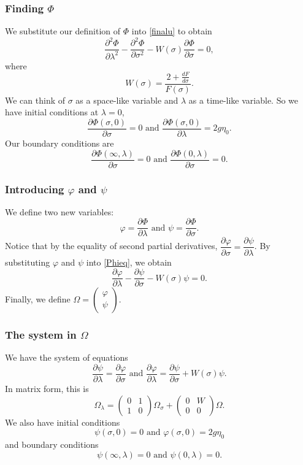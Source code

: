\documentclass[xcolor=dvipsnames]{beamer}
\begin{document}
\begin{frame}
\frametitle{Finding $\Phi$}
We substitute our definition of $\Phi$ into \eqref{finalu} to obtain
\begin{equation}\label{Phieq}
\frac{\partial^2 \Phi}{\partial \lambda^2} - \frac{\partial^2 \Phi}{\partial \sigma^2} - W(\sigma) \frac{\partial \Phi}{\partial \sigma} = 0,
\end{equation}
where
\[
W(\sigma) = \frac{2 + \frac{dF}{d\sigma}}{F(\sigma)}.
\]
We can think of $\sigma$ as a space-like variable and $\lambda$ as a time-like variable. So we have initial conditions at $\lambda = 0$,
\[
\frac{\partial \Phi(\sigma,0)}{\partial \sigma} = 0 \text{ and } \frac{\partial \Phi(\sigma,0)}{\partial \lambda} = 2g\eta_0.
\]
Our boundary conditions are
\[
\frac{\partial \Phi(\infty,\lambda)}{\partial \sigma} = 0 \text{ and } \frac{\partial \Phi(0,\lambda)}{\partial \sigma} = 0.
\]
\end{frame}

\begin{frame}
\frametitle{Introducing $\varphi$ and $\psi$}
We define two new variables:
\[
\varphi = \frac{\partial \Phi}{\partial \lambda} \text{ and } \psi = \frac{\partial \Phi}{\partial \sigma}.
\]
Notice that by the equality of second partial derivatives, $\dfrac{\partial \varphi}{\partial \sigma} = \dfrac{\partial \psi}{\partial \lambda}$.
By substituting $\varphi$ and $\psi$ into \eqref{Phieq}, we obtain
\[
\frac{\partial \varphi}{\partial \lambda} - \frac{\partial \psi}{\partial \sigma} - W(\sigma) \psi = 0.
\]
Finally, we define $\Omega = \begin{pmatrix} \varphi \\ \psi \end{pmatrix}$.
\end{frame}

\begin{frame}
\frametitle{The system in $\Omega$}
We have the system of equations
\[
\dfrac{\partial \psi}{\partial \lambda} = \dfrac{\partial \varphi}{\partial \sigma} \text{ and } \frac{\partial \varphi}{\partial \lambda} = \frac{\partial \psi}{\partial \sigma} + W(\sigma) \psi.
\]
In matrix form, this is
\[
\Omega_\lambda = \begin{pmatrix} 0 & 1 \\ 1 & 0 \end{pmatrix} \Omega_\sigma + \begin{pmatrix} 0 & W \\ 0 & 0 \end{pmatrix} \Omega.
\]
We also have initial conditions
\[
\psi(\sigma, 0) = 0 \text{ and } \varphi(\sigma,0) = 2g\eta_0
\]
and boundary conditions
\[
\psi(\infty,\lambda) = 0 \text{ and } \psi(0,\lambda) = 0.
\]
\end{frame}
\end{document}
